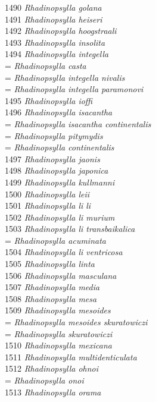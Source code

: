 \documentclass[
]{article}
\begin{document}
1490 \emph{Rhadinopsylla golana}\\
1491 \emph{Rhadinopsylla heiseri}\\
1492 \emph{Rhadinopsylla hoogstraali}\\
1493 \emph{Rhadinopsylla insolita}\\
1494 \emph{Rhadinopsylla integella}\\
= \emph{Rhadinopsylla casta}\\
= \emph{Rhadinopsylla integella nivalis}\\
= \emph{Rhadinopsylla integella paramonovi}\\
1495 \emph{Rhadinopsylla ioffi}\\
1496 \emph{Rhadinopsylla isacantha}\\
= \emph{Rhadinopsylla isacantha continentalis}\\
= \emph{Rhadinopsylla pitymydis}\\
= \emph{Rhadinopsylla continentalis}\\
1497 \emph{Rhadinopsylla jaonis}\\
1498 \emph{Rhadinopsylla japonica}\\
1499 \emph{Rhadinopsylla kullmanni}\\
1500 \emph{Rhadinopsylla leii}\\
1501 \emph{Rhadinopsylla li li}\\
1502 \emph{Rhadinopsylla li murium}\\
1503 \emph{Rhadinopsylla li transbaikalica}\\
= \emph{Rhadinopsylla acuminata}\\
1504 \emph{Rhadinopsylla li ventricosa}\\
1505 \emph{Rhadinopsylla linta}\\
1506 \emph{Rhadinopsylla masculana}\\
1507 \emph{Rhadinopsylla media}\\
1508 \emph{Rhadinopsylla mesa}\\
1509 \emph{Rhadinopsylla mesoides}\\
= \emph{Rhadinopsylla mesoides skuratowiczi}\\
= \emph{Rhadinopsylla skuratowiczi}\\
1510 \emph{Rhadinopsylla mexicana}\\
1511 \emph{Rhadinopsylla multidenticulata}\\
1512 \emph{Rhadinopsylla ohnoi}\\
= \emph{Rhadinopsylla onoi}\\
1513 \emph{Rhadinopsylla orama}\\
\end{document}
